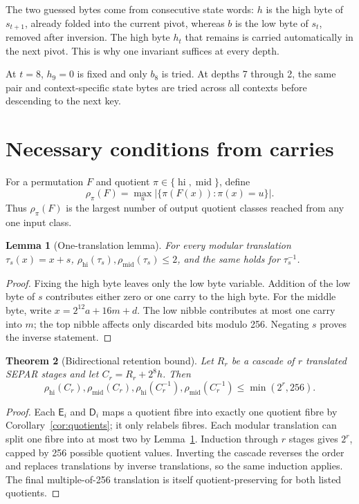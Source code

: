 \documentclass[10pt]{article}
\theoremstyle{plain}
\newtheorem{theorem}{Theorem}
\newtheorem{lemma}[theorem]{Lemma}
\theoremstyle{definition}
\theoremstyle{remark}
\newcommand{\E}{\mathsf E}
\newcommand{\D}{\mathsf D}
\newcommand{\hi}{\operatorname{hi}}
\newcommand{\midb}{\operatorname{mid}}
\begin{document}
The two guessed bytes come from consecutive state words: \(h\) is the high
byte of \(s_{t+1}\), already folded into the current pivot, whereas \(b\) is
the low byte of \(s_t\), removed after inversion.  The high byte \(h_t\) that
remains is carried automatically in the next pivot.  This is why one invariant
suffices at every depth.

At \(t=8\), \(h_9=0\) is fixed and only \(b_8\) is tried.  At depths
7 through 2, the same pair and context-specific state bytes are tried across all
contexts before descending to the next key.

\section{Necessary conditions from carries}
\label{sec:carry}

For a permutation \(F\) and quotient \(\pi\in\{\hi,\midb\}\), define
\begin{equation}
\rho_\pi(F)=\max_u
\bigl|\{\pi(F(x)):\pi(x)=u\}\bigr|.
\label{eq:rho}
\end{equation}
Thus \(\rho_\pi(F)\) is the largest number of output quotient classes reached
from any one input class.

\begin{lemma}[One-translation lemma]
\label{lem:translation}
For every modular translation \(\tau_s(x)=x+s\),
\(\rho_{\hi}(\tau_s),\rho_{\midb}(\tau_s)\leq2\), and the same holds for
\(\tau_s^{-1}\).
\end{lemma}
\begin{proof}
Fixing the high byte leaves only the low byte variable.  Addition of the low
byte of \(s\) contributes either zero or one carry to the high byte.  For the
middle byte, write \(x=2^{12}a+16m+d\).  The low nibble contributes at most
one carry into \(m\); the top nibble affects only discarded bits modulo 256.
Negating \(s\) proves the inverse statement.
\end{proof}

\begin{theorem}[Bidirectional retention bound]
\label{thm:carry}
Let \(R_r\) be a cascade of \(r\) translated SEPAR stages and let
\(C_r=R_r+2^8h\).  Then
\begin{equation}
\rho_{\hi}(C_r),\rho_{\midb}(C_r),
\rho_{\hi}(C_r^{-1}),\rho_{\midb}(C_r^{-1})
\leq\min(2^r,256).
\label{eq:fourbounds}
\end{equation}
\end{theorem}
\begin{proof}
Each \(\E_i\) and \(\D_i\) maps a quotient fibre into exactly one quotient
fibre by Corollary~\ref{cor:quotients}; it only relabels fibres.  Each modular
translation can split one fibre into at most two by
Lemma~\ref{lem:translation}.  Induction through \(r\) stages gives \(2^r\),
capped by 256 possible quotient values.  Inverting the cascade reverses the
order and replaces translations by inverse translations, so the same
induction applies.  The final multiple-of-256 translation is itself
quotient-preserving for both listed quotients.
\end{proof}
\end{document}
